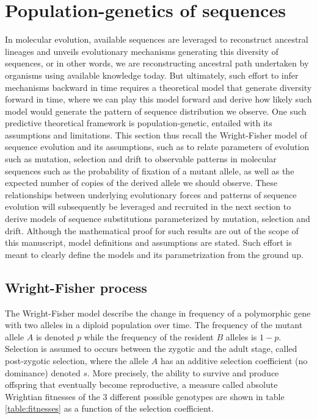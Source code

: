 \section{Population-genetics of sequences}
In molecular evolution, available sequences are leveraged to reconstruct ancestral lineages and unveils evolutionary mechanisms generating this diversity of sequences, or in other words, we are reconstructing ancestral path undertaken by organisms using available knowledge today.
But ultimately, such effort to infer mechanisms backward in time requires a theoretical model that generate diversity forward in time, where we can play this model forward and derive how likely such model would generate the pattern of sequence distribution we observe.
One such predictive theoretical framework is population-genetic, entailed with its assumptions and limitations.
This section thus recall the Wright-Fisher model of sequence evolution and its assumptions, such as to relate parameters of evolution such as mutation, selection and drift to observable patterns in molecular sequences such as the probability of fixation of a mutant \gls{allele}, as well as the expected number of copies of the derived \gls{allele} we should observe.
These relationships between underlying evolutionary forces and patterns of sequence evolution will subsequently be leveraged and recruited in the next section to derive models of sequence substitutions parameterized by mutation, selection and drift.
Although the mathematical proof for such results are out of the scope of this manuscript, model definitions and assumptions are stated. 
Such effort is meant to clearly define the models and its parametrization from the ground up. 

\subsection{Wright-Fisher process}

The Wright-Fisher model describe the change in frequency of a \gls{polymorphic} gene with two alleles in a \gls{diploid} population over time. 
The frequency of the mutant \gls{allele} $A$ is denoted $p$ while the frequency of the resident $B$ alleles is $1-p$.
Selection is assumed to occurs between the zygotic and the adult stage, called post-zygotic selection, where the \gls{allele} $A$ has an additive selection coefficient (no dominance) denoted $s$.
More precisely, the ability to survive and produce offspring that eventually become reproductive, a measure called absolute Wrightian fitnesses of the $3$ different possible genotypes are shown in table \ref{table:fitnesses} as a function of the selection coefficient.

